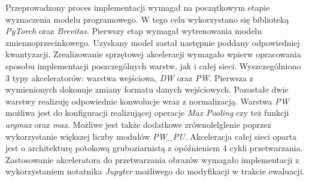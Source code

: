 Przeprowadzony proces implementacji wymagał na początkowym etapie wyznaczenia modelu programowego. 
W tego celu wykorzystano się biblioteką \emph{PyTorch} oraz \emph{Brevitas}.
Pierwszy etap wymagał wytrenowania modelu zmiennoprzecinkowego.
Uzyskany model zastał następnie poddany odpowiedniej kwantyzacji.
Zrealizowanie sprzętowej akceleracji wymagało wpierw opracowania sposobu implementacji poszczególnych warstw, jak i całej sieci.
Wyszczególniono 3 typy akceleratorów: warstwa wejściowa,  \emph{DW} oraz \emph{PW}.
Pierwsza z wymienionych dokonuje zmiany formatu danych wejściowych.
Pozostałe dwie warstwy realizuję odpowiednie konwolucje wraz z normalizacją.
Warstwa \emph{PW} możliwa jest do konfiguracji realizującej operacje \emph{Max Pooling} czy też funkcji \emph{argmax} oraz \emph{max}. 
Możliwe jest także dodatkowe zrównolelglenie poprzez wykorzystanie większej liczby modułów \emph{PW\_PU}. 
Akceleracja całej sieci oparta jest o architekturę potokową gruboziarnistą z opóźnieniem 4 cykli przetwarzania.
Zastosowanie akceleratora do przetwarzania obrazów wymagało implementacji z wykorzystaniem notatnika \emph{Jupyter} możliwego do modyfikacji w trakcie ewaluacji. 












